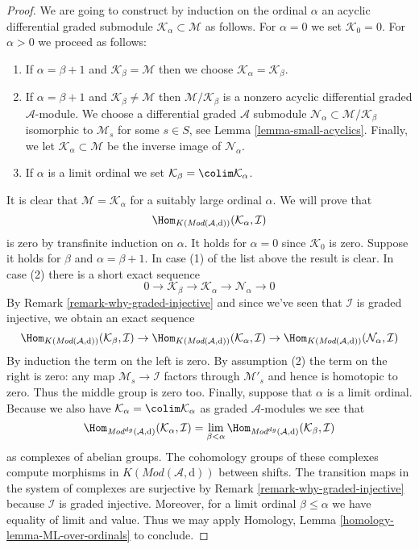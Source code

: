 \begin{proof}
\medskip\noindent
We are going to construct by induction on the ordinal $\alpha$
an acyclic differential graded submodule
$\mathcal{K}_\alpha \subset \mathcal{M}$ as follows.
For $\alpha = 0$ we set $\mathcal{K}_0 = 0$. For $\alpha > 0$
we proceed as follows:
\begin{enumerate}
\item If $\alpha = \beta + 1$ and $\mathcal{K}_\beta = \mathcal{M}$
then we choose $\mathcal{K}_\alpha = \mathcal{K}_\beta$.
\item If $\alpha = \beta + 1$ and $\mathcal{K}_\beta \not = \mathcal{M}$
then $\mathcal{M}/\mathcal{K}_\beta$ is a nonzero acyclic
differential graded $\mathcal{A}$-module.
We choose a differential graded $\mathcal{A}$ submodule
$\mathcal{N}_\alpha \subset \mathcal{M}/\mathcal{K}_\beta$
isomorphic to $\mathcal{M}_s$ for some $s \in S$, see
Lemma \ref{lemma-small-acyclics}.
Finally, we let $\mathcal{K}_\alpha \subset \mathcal{M}$
be the inverse image of $\mathcal{N}_\alpha$.
\item If $\alpha$ is a limit ordinal we set
$\mathcal{K}_\beta = \colim \mathcal{K}_\alpha$.
\end{enumerate}
It is clear that $\mathcal{M} = \mathcal{K}_\alpha$ for a suitably large
ordinal $\alpha$. We will prove that
$$
\Hom_{K(\textit{Mod}(\mathcal{A}, \text{d}))}(\mathcal{K}_\alpha, \mathcal{I})
$$
is zero by transfinite induction on $\alpha$. It holds for $\alpha = 0$
since $\mathcal{K}_0$ is zero. Suppose it holds for $\beta$ and
$\alpha = \beta + 1$. In case (1) of the list above the result is clear.
In case (2) there is a short exact sequence
$$
0 \to \mathcal{K}_\beta \to \mathcal{K}_\alpha \to \mathcal{N}_\alpha \to 0
$$
By Remark \ref{remark-why-graded-injective}
and since we've seen that $\mathcal{I}$ is graded
injective, we obtain an exact sequence
$$
\Hom_{K(\textit{Mod}(\mathcal{A}, \text{d}))}(\mathcal{K}_\beta, \mathcal{I})
\to
\Hom_{K(\textit{Mod}(\mathcal{A}, \text{d}))}(\mathcal{K}_\alpha, \mathcal{I})
\to
\Hom_{K(\textit{Mod}(\mathcal{A}, \text{d}))}(\mathcal{N}_\alpha, \mathcal{I})
$$
By induction the term on the left is zero. By assumption (2)
the term on the right is zero: any map $\mathcal{M}_s \to \mathcal{I}$
factors through $\mathcal{M}'_s$ and hence is homotopic to zero.
Thus the middle group is zero too. Finally, suppose that $\alpha$ is a
limit ordinal. Because we also have
$\mathcal{K}_\alpha = \colim \mathcal{K}_\alpha$ as graded
$\mathcal{A}$-modules we see that
$$
\Hom_{\textit{Mod}^{dg}(\mathcal{A}, \text{d})}
(\mathcal{K}_\alpha, \mathcal{I})
= \lim_{\beta < \alpha}
\Hom_{\textit{Mod}^{dg}(\mathcal{A}, \text{d})}
(\mathcal{K}_\beta, \mathcal{I})
$$
as complexes of abelian groups. The cohomology groups of these
complexes compute morphisms in $K(\textit{Mod}(\mathcal{A}, \text{d}))$
between shifts. The transition maps in the system of complexes
are surjective by Remark \ref{remark-why-graded-injective}
because $\mathcal{I}$ is graded injective.
Moreover, for a limit ordinal $\beta \leq \alpha$
we have equality of limit and value. Thus we may apply
Homology, Lemma \ref{homology-lemma-ML-over-ordinals}
to conclude.
\end{proof}

